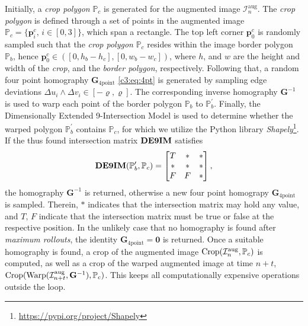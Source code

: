Initially, a \textit{crop polygon} $\mathbb{P}_c$ is generated for the augmented image $\mathcal{I}^\text{aug}_n$. The \textit{crop polygon} is defined through a set of points in the augmented image $\mathbb{P}_c = \{\mathbf{p}^c_i,\,i\in \left[0,3\right]\}$, which span a rectangle. The top left corner $\mathbf{p}^c_0$ is randomly sampled such that the \textit{crop polygon} $\mathbb{P}_c$ resides within the image border polygon $\mathbb{P}_b$, hence $\mathbf{p}^c_0 \in ([0, h_b - h_c], [0, w_b - w_c])$, where $h$, and $w$ are the height and width of the \textit{crop}, and the \textit{border polygon}, respectively. Following that, a random four point homography $\mathbf{G}_{4\text{point}}$ \eqref{c3:eq:4pt} is generated by sampling edge deviations $\Delta u_i \land \Delta v_i \in [-\varrho, \varrho]$. The corresponding inverse homography $\mathbf{G}^{-1}$ is used to warp each point of the border polygon $\mathbb{P}_b$ to $\mathbb{P}^\prime_b$. Finally, the Dimensionally Extended 9-Intersection Model \cite{clementini1994modelling} is used to determine whether the warped polygon $\mathbb{P}^\prime_b$ contains $\mathbb{P}_c$, for which we utilize the Python library \textit{Shapely}\footnote[3]{\url{https://pypi.org/project/Shapely}}. If the thus found intersection matrix $\operatorname{\mathbf{DE9IM}}$ satisfies
\begin{equation}
    \operatorname{\mathbf{DE9IM}}(\mathbb{P}^\prime_b, \mathbb{P}_c) = \begin{bmatrix}
        T & * & * \\
        * & * & * \\
        F & F & *
    \end{bmatrix},
\end{equation}
the homography $\mathbf{G}^{-1}$ is returned, otherwise a new four point homograpy $\mathbf{G}_{4\text{point}}$ is sampled. Therein, $*$ indicates that the intersection matrix may hold any value, and $T,\,F$ indicate that the intersection matrix must be true or false at the respective position. In the unlikely case that no homography is found after \textit{maximum rollouts}, the identity $\mathbf{G}_{4\text{point}} = \mathbf{0}$ is returned. Once a suitable homography is found, a crop of the augmented image $\operatorname{Crop}(\mathcal{I}^\text{aug}_n, \mathbb{P}_c)$ is computed, as well as a crop of the warped augmented image at time $n+t$, $\operatorname{Crop}(\operatorname{Warp}(\mathcal{I}^\text{aug}_{n+t}, \mathbf{G}^{-1}), \mathbb{P}_c)$. This keeps all computationally expensive operations outside the loop.

